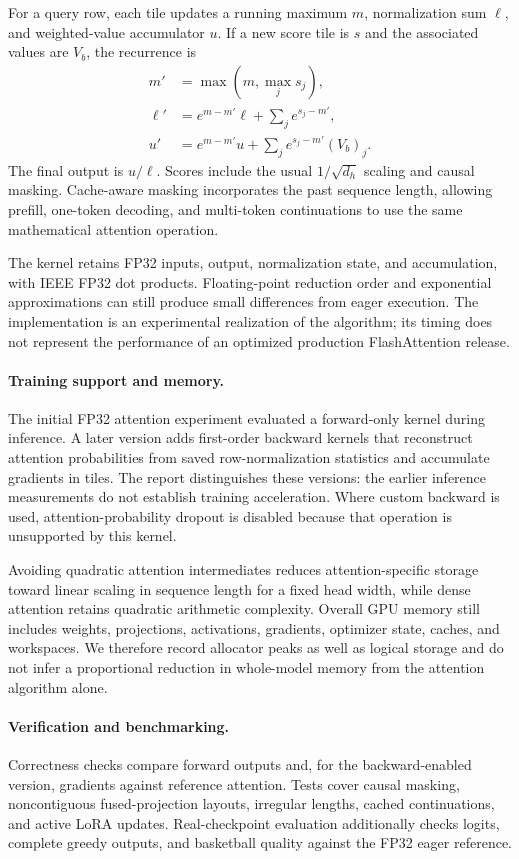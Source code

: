 For a query row, each tile updates a running maximum $m$, normalization sum $\ell$, and weighted-value accumulator $u$. If a new score tile is $s$ and the associated values are $V_b$, the recurrence is
\begin{align}
 m'&=\max(m,\max_j s_j),\\
 \ell'&=e^{m-m'}\ell+\sum_j e^{s_j-m'},\\
 u'&=e^{m-m'}u+\sum_j e^{s_j-m'}(V_b)_j.
\end{align}
The final output is $u/\ell$. Scores include the usual $1/\sqrt{d_h}$ scaling and causal masking. Cache-aware masking incorporates the past sequence length, allowing prefill, one-token decoding, and multi-token continuations to use the same mathematical attention operation.

The kernel retains FP32 inputs, output, normalization state, and accumulation, with IEEE FP32 dot products. Floating-point reduction order and exponential approximations can still produce small differences from eager execution. The implementation is an experimental realization of the algorithm; its timing does not represent the performance of an optimized production FlashAttention release.

\paragraph{Training support and memory.}
The initial FP32 attention experiment evaluated a forward-only kernel during inference. A later version adds first-order backward kernels that reconstruct attention probabilities from saved row-normalization statistics and accumulate gradients in tiles. The report distinguishes these versions: the earlier inference measurements do not establish training acceleration. Where custom backward is used, attention-probability dropout is disabled because that operation is unsupported by this kernel.

Avoiding quadratic attention intermediates reduces attention-specific storage toward linear scaling in sequence length for a fixed head width, while dense attention retains quadratic arithmetic complexity. Overall GPU memory still includes weights, projections, activations, gradients, optimizer state, caches, and workspaces. We therefore record allocator peaks as well as logical storage and do not infer a proportional reduction in whole-model memory from the attention algorithm alone.

\paragraph{Verification and benchmarking.}
Correctness checks compare forward outputs and, for the backward-enabled version, gradients against reference attention. Tests cover causal masking, noncontiguous fused-projection layouts, irregular lengths, cached continuations, and active LoRA updates. Real-checkpoint evaluation additionally checks logits, complete greedy outputs, and basketball quality against the FP32 eager reference.

